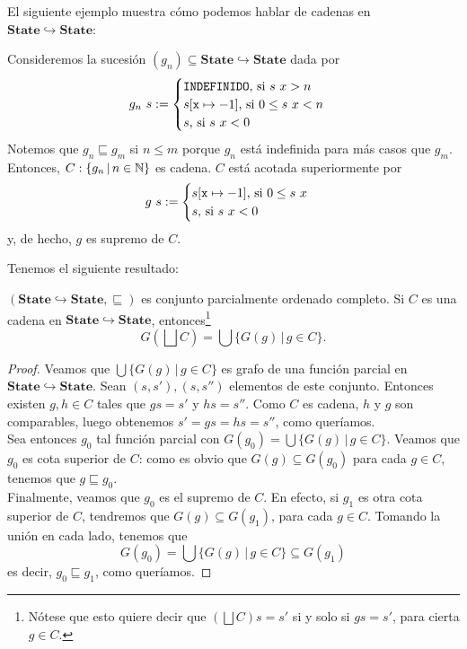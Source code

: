 El siguiente ejemplo muestra cómo podemos hablar de cadenas en $\mathbf{State}\hookrightarrow \mathbf{State}$:
\begin{example}
Consideremos la sucesión $(g_n)\subseteq \mathbf{State}\hookrightarrow \mathbf{State}$ dada por
$$g_n\ s := \begin{cases}
    \texttt{INDEFINIDO} \text{, si } s\ x > n \\
    s[\texttt{x} \mapsto -1] \text{, si } 0 \leq s\ x < n\\
    s \text{, si } s\ x < 0
\end{cases}$$
Notemos que $g_n \sqsubseteq g_m$ si $n \leq m$ porque $g_n$ está indefinida para más casos que $g_m$. Entonces, $C: \{g_n \, | \, n \in \mathbb{N}\}$ es cadena. $C$ está acotada superiormente por
$$g\ s := \begin{cases}
    s[\texttt{x} \mapsto -1] \text{, si } 0 \leq s\ x\\
    s \text{, si } s\ x < 0
\end{cases}$$
y, de hecho, $g$ es supremo de $C$.
\end{example}

Tenemos el siguiente resultado:

\begin{lema}
$(\mathbf{State}\hookrightarrow \mathbf{State}, \sqsubseteq)$ es conjunto parcialmente ordenado completo. Si $C$ es una cadena en $\mathbf{State}\hookrightarrow \mathbf{State}$, entonces\footnote{Nótese que esto quiere decir que $(\bigsqcup C)s = s'$ si y solo si $gs = s'$, para cierta $g \in C$.}
$$G\left(\bigsqcup C\right) = \bigcup\{G(g) \, | \, g \in C\}.$$
\end{lema}
\begin{proof}
Veamos que $\bigcup\{G(g) \, | \, g \in C\}$ es grafo de una función parcial en $\mathbf{State}\hookrightarrow \mathbf{State}$. Sean $(s, s'), (s, s'')$ elementos de este conjunto. Entonces existen $g, h \in C$ tales que $gs = s'$ y $hs = s''$. Como $C$ es cadena, $h$ y $g$ son comparables, luego obtenemos $s' = gs = hs = s''$, como queríamos. 
\\

Sea entonces $g_0$ tal función parcial con $G(g_0) = \bigcup\{G(g) \, | \, g \in C\}$. Veamos que $g_0$ es cota superior de $C$: como es obvio que $G(g) \subseteq G(g_0)$ para cada $g \in C$, tenemos que $g \sqsubseteq g_0$.
\\

Finalmente, veamos que $g_0$ es el supremo de $C$. En efecto, si $g_1$ es otra cota superior de $C$, tendremos que $G(g) \subseteq G(g_1)$, para cada $g \in C$. Tomando la unión en cada lado, tenemos que 
$$G(g_0) = \bigcup\{G(g) \, | \, g \in C\} \subseteq G(g_1)$$
es decir, $g_0 \sqsubseteq g_1$, como queríamos.
\end{proof}

